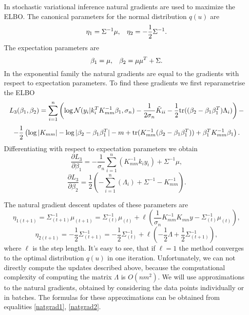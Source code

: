 \documentclass[12pt]{article}
\begin{document}
		In stochastic variational inference natural gradients are used to maximize the ELBO. The canonical parameters for the normal distribution $q(u)$ are
		$$\eta_1 = \Sigma^{-1} \mu, \hspace{0.3cm}\eta_2 = - \frac 1 2 \Sigma^{-1}.$$
		The expectation parameters are
		$$\beta_1 = \mu, \hspace{0.3cm}\beta_2 = \mu \mu^T + \Sigma.$$
		In the exponential family the natural gradients are equal to the gradients with respect to expectation parameters. To find these gradients we first reparametrise the ELBO
		$$L_3(\beta_1, \beta_2) =  \sum_{i = 1}^{n} \left( \log \mathcal{N}(y_i | k_i^T K_{mm}^{-1} \beta_1, \sigma_n) - \frac 1 {2 \sigma_n} \tilde K_{ii} - \frac 1 2 \mbox{tr} ((\beta_2 - \beta_1 \beta_1^T) \Lambda_i) \right) - $$
		$$ -\frac 1 2 \left (\log |K_{mm}| - \log |\beta_2 - \beta_1 \beta_1^T| - m + \mbox{tr}(K_{mm}^{-1} (\beta_2 - \beta_1 \beta_1^T)) + \beta_1^T K_{mm}^{-1} \beta_1 \right).$$
		Differentiating with respect to expectation parameters we obtain
		\begin{equation}
			\label{natgrad1}
			\frac{\partial L_3} {\partial\beta_1} =  -\frac 1 {\sigma_n}  \sum_{i = 1}^{n} \left(K_{mm}^{-1} k_i y_i \right) + \Sigma^{-1} \mu,
		\end{equation}
		\begin{equation}
			\label{natgrad2}
			\frac{\partial L_3} {\partial\beta_2} = \frac 1 {2} \left(-\sum_{i = 1}^{n} (\Lambda_i) + \Sigma^{-1}  - K_{mm}^{-1}\right).
		\end{equation}
		
		The natural gradient descent updates of these parameters are
		$$\eta_{1(t+1)} = \Sigma_{(t+1)}^{-1} \mu_{(t+1)} = \Sigma_{(t)}^{-1} \mu_{(t)} + \ell \left(\frac 1 {\sigma_n} K_{mm}^{-1} K_{mn} y - \Sigma_{(t)}^{-1} \mu_{(t)} \right), $$
		$$\eta_{2 (t+1)} = -\frac 1 2 \Sigma_{(t+1)}^{-1} = -\frac 1 2 \Sigma_{(t)}^{-1}  + \ell \left( -\frac 1 2 \Lambda + \frac 1 2 \Sigma_{(t+1)}^{-1}\right),$$
		where $\ell$ is the step length. It's easy to see, that if $\ell = 1$ the method converges to the optimal distribution $q(u)$ in one iteration. Unfortunately, we can not directly compute the updates described above, because the computational complexity of computing the matrix $\Lambda$ is $O(n m^2)$. We will use approximations to the natural gradients, obtained by considering the data points individually or in batches. The formulas for these approximations can be obtained from equalities \ref{natgrad1}, \ref{natgrad2}.
		
\end{document}
